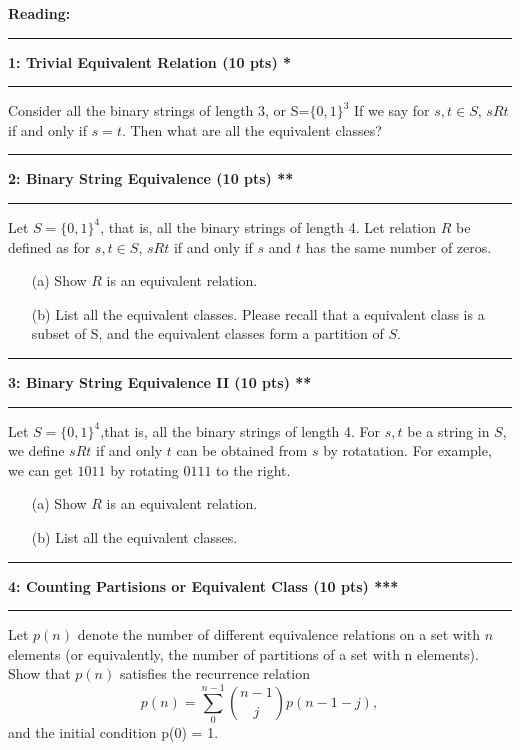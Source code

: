 \documentclass[11pt]{article}
\newcommand\question[2]{\vspace{.25in}\hrule\textbf{#1: #2}\vspace{.5em}\hrule\vspace{.10in}}
\begin{document}
\raggedright
\newcommand\NAME{Xiang Huang}  %
\newcommand\UISID{\texttt{UISid}}     %
\newcommand\HWNUM{12}              %




\textbf{Reading:}

\question{1}{Trivial Equivalent Relation (10 pts) *}
Consider all the binary strings of length 3, or S=$\{0,1\}^3$ If we say for $s, t \in S$, $s R t$ if and only if $s=t$. Then what are all the equivalent classes?

\question{2}{Binary String Equivalence (10 pts) **}
Let $S=\{0,1\}^4$, that is, all the binary strings of length 4. Let relation $R$ be defined as for $s,t\in S$,
$s R t$ if and only if $s$ and $t$ has the same number of zeros.

\begin{enumerate}
  \item[(a)] Show $R$ is an equivalent relation.
  \item[(b)] List all the equivalent classes. Please recall that a equivalent class is a subset of S, and the equivalent classes form a partition of $S$.
\end{enumerate}


\question{3}{Binary String Equivalence II (10 pts) **}
Let $S=\{0,1\}^4$,that is, all the binary strings of length 4. For $s, t$ be a string in $S$, we define $sRt$ if and only $t$ can be obtained from $s$ by rotatation. For example, we can get $1011$ by rotating $0111$ to the right.

\begin{enumerate}
  \item[(a)] Show $R$ is an equivalent relation.
  \item[(b)] List all the equivalent classes.
\end{enumerate}

\question{4}{Counting Partisions or Equivalent Class (10 pts) *** }

Let $p(n)$ denote the number of different equivalence
relations on a set with $n$ elements (or equivalently, the number of partitions of a set with n elements). Show that $p(n)$ satisfies the recurrence relation
 \[
   p(n)=\sum_0^{n-1} \binom{n-1}{j} p(n-1-j),
 \]
 and the initial
condition p(0) = 1. \\
\end{document}
